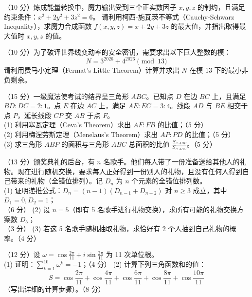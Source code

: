 \begin{questions}
  \item （10 分）炼成能量转换中，魔力输出受到三个正实数因子 $x, y, z$ 的制约，且满足约束条件：$x^2 + 2y^2 + 3z^2 = 6$。
  请利用柯西-施瓦茨不等式（Cauchy-Schwarz Inequality），求魔力合成函数 $f(x,y,z) = x + 2y + 3z$ 的最大值，并指出取得最大值时 $x, y, z$ 的值。
    \answerspace{48mm}
  \item （10 分）为了破译世界线变动率的安全密钥，需要求出以下巨大整数的模：
  $$N = 3^{2026} + 4^{2026} \pmod{13}$$
  请利用费马小定理（Fermat's Little Theorem）计算并求出 $N$ 在模 13 下的最小非负剩余。
    \answerspace{48mm}
  \item （15 分）一级魔法使考试的结界呈三角形 $ABC$。已知点 $D$ 在边 $BC$ 上，且满足 $BD : DC = 2 : 1$。点 $E$ 在边 $AC$ 上，满足 $AE : EC = 3 : 4$。线段 $AD$ 与 $BE$ 相交于点 $P$，延长线段 $CP$ 交 $AB$ 于点 $F$。\\
  (1) 利用塞瓦定理（Ceva's Theorem）求出 $AF : FB$ 的比值；（5 分）\\
    \answerspace{50mm}
  (2) 利用梅涅劳斯定理（Menelaus's Theorem）求出 $AP : PD$ 的比值；（5 分）\\
    \answerspace{80mm}
  (3) 求三角形 $ABP$ 的面积与三角形 $ABC$ 总面积的比值 $\frac{S_{\triangle ABP}}{S_{\triangle ABC}}$。（5 分）
    \answerspace{70mm}
  \item （13 分）颁奖典礼的后台，有 $n$ 名歌手。他们每人带了一份准备送给其他人的礼物。现在进行随机交换，要求每人正好得到一份别人的礼物，且没有任何人得到自己带来的礼物（全错位排列）。记 $D_n$ 为 $n$ 个元素的全错位排列数。\\
  (1) 证明递推公式：$D_n = (n-1)(D_{n-1} + D_{n-2})$ 对 $n \ge 3$ 成立，其中 $D_1 = 0, D_2 = 1$；\\（6 分）
    \answerspace{70mm}
  (2) 设 $n = 5$（即有 5 名歌手进行礼物交换），求所有可能的礼物交换方案数 $D_5$；\\（3 分）
    \answerspace{70mm}
  (3) 若这 5 名歌手随机抽取礼物，求恰好有 2 个人抽到自己礼物的概率。（4 分）
    \answerspace{70mm}
  \item （12 分）设 $\omega = \cos\frac{2\pi}{11} + i \sin\frac{2\pi}{11}$ 为 11 次单位根。\\
  (1) 证明：$\sum_{k=1}^{10} \omega^k = -1$；（4 分）
  (2) 计算下列三角函数和的值：
      $$S = \cos\frac{2\pi}{11} + \cos\frac{4\pi}{11} + \cos\frac{6\pi}{11} + \cos\frac{8\pi}{11} + \cos\frac{10\pi}{11}$$
      （写出详细的计算步骤）。（8 分）
    \answerspace{58mm}
\end{questions}
